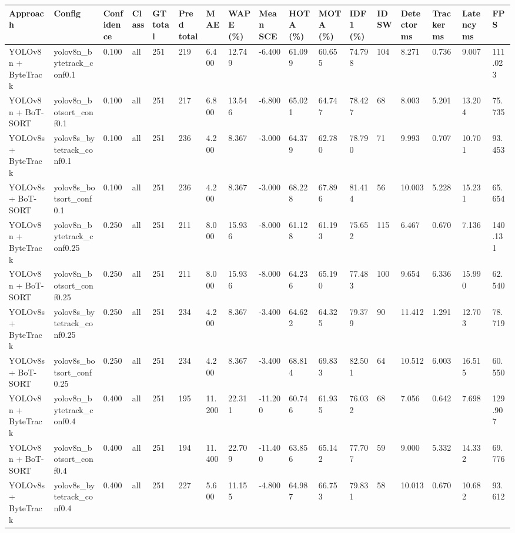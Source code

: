 \begin{tabular}{lllllllllllllllll}
\toprule
Approach & Config & Confidence & Class & GT total & Pred total & MAE & WAPE (\%) & Mean SCE & HOTA (\%) & MOTA (\%) & IDF1 (\%) & IDSW & Detector ms & Tracker ms & Latency ms & FPS \\
\midrule
YOLOv8n + ByteTrack & yolov8n\_bytetrack\_conf0.1 & 0.100 & all & 251 & 219 & 6.400 & 12.749 & -6.400 & 61.099 & 60.655 & 74.798 & 104 & 8.271 & 0.736 & 9.007 & 111.023 \\
YOLOv8n + BoT-SORT & yolov8n\_botsort\_conf0.1 & 0.100 & all & 251 & 217 & 6.800 & 13.546 & -6.800 & 65.021 & 64.747 & 78.427 & 68 & 8.003 & 5.201 & 13.204 & 75.735 \\
YOLOv8s + ByteTrack & yolov8s\_bytetrack\_conf0.1 & 0.100 & all & 251 & 236 & 4.200 & 8.367 & -3.000 & 64.379 & 62.780 & 78.790 & 71 & 9.993 & 0.707 & 10.701 & 93.453 \\
YOLOv8s + BoT-SORT & yolov8s\_botsort\_conf0.1 & 0.100 & all & 251 & 236 & 4.200 & 8.367 & -3.000 & 68.228 & 67.896 & 81.414 & 56 & 10.003 & 5.228 & 15.231 & 65.654 \\
YOLOv8n + ByteTrack & yolov8n\_bytetrack\_conf0.25 & 0.250 & all & 251 & 211 & 8.000 & 15.936 & -8.000 & 61.128 & 61.193 & 75.652 & 115 & 6.467 & 0.670 & 7.136 & 140.131 \\
YOLOv8n + BoT-SORT & yolov8n\_botsort\_conf0.25 & 0.250 & all & 251 & 211 & 8.000 & 15.936 & -8.000 & 64.236 & 65.190 & 77.483 & 100 & 9.654 & 6.336 & 15.990 & 62.540 \\
YOLOv8s + ByteTrack & yolov8s\_bytetrack\_conf0.25 & 0.250 & all & 251 & 234 & 4.200 & 8.367 & -3.400 & 64.622 & 64.325 & 79.379 & 90 & 11.412 & 1.291 & 12.703 & 78.719 \\
YOLOv8s + BoT-SORT & yolov8s\_botsort\_conf0.25 & 0.250 & all & 251 & 234 & 4.200 & 8.367 & -3.400 & 68.814 & 69.833 & 82.501 & 64 & 10.512 & 6.003 & 16.515 & 60.550 \\
YOLOv8n + ByteTrack & yolov8n\_bytetrack\_conf0.4 & 0.400 & all & 251 & 195 & 11.200 & 22.311 & -11.200 & 60.746 & 61.935 & 76.032 & 68 & 7.056 & 0.642 & 7.698 & 129.907 \\
YOLOv8n + BoT-SORT & yolov8n\_botsort\_conf0.4 & 0.400 & all & 251 & 194 & 11.400 & 22.709 & -11.400 & 63.856 & 65.142 & 77.707 & 59 & 9.000 & 5.332 & 14.332 & 69.776 \\
YOLOv8s + ByteTrack & yolov8s\_bytetrack\_conf0.4 & 0.400 & all & 251 & 227 & 5.600 & 11.155 & -4.800 & 64.987 & 66.753 & 79.831 & 58 & 10.013 & 0.670 & 10.682 & 93.612 \\

\end{tabular}
